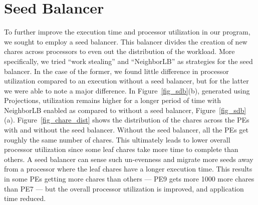 \documentclass[10pt,oneside]{article}
\begin{document}
\section{Seed Balancer}
To further improve the execution time and processor utilization in our program,
  we sought to employ a seed balancer. This balancer divides the creation of
  new chares across processors to even out the distribution of the workload.
  More specifically, we tried ``work stealing'' and ``NeighborLB'' as strategies
  for the seed balancer. In the case of the former, we found little difference in processor
    utilization compared to an execution without a seed balancer, but for the latter we
      were able to note a major difference. In Figure~\ref{fig_sdb}(b), generated
      using Projections, utilization remains higher for a longer period of time
      with NeighborLB enabled as compared to without a seed balancer,
           Figure~\ref{fig_sdb}(a).  Figure~\ref{fig_chare_dist} shows the distribution of the 
           chares across the PEs with and without the seed balancer. Without the seed balancer, 
           all the PEs get roughly the same number of chares. This ultimately leads to lower overall
           processor utilization since some leaf chares take more time to complete than others. A 
           seed balancer can sense such un-evenness and migrate more seeds away from a processor
           where the leaf chares have a longer execution time. This results in some PEs getting more chares
           than others --- PE9 gets more 1000 more chares than PE7 --- but the overall processor utilization is 
           improved, and application time reduced.
        
\end{document}
